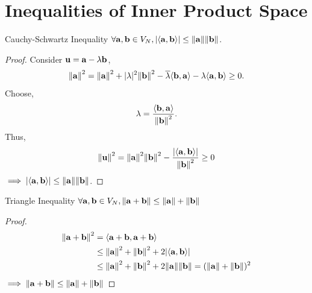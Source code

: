 \documentclass{book}
\def\innerproduct#1#2{\langle#1,#2\rangle}
\begin{document}
\section{Inequalities of Inner Product Space}
\begin{Theorems}{Cauchy-Schwartz Inequality}{}
	$\forall \vb{a},\vb{b} \in V_N, \abs{\innerproduct{\vb{a}}{\vb{b}}} \leq \norm{\vb{a}}\norm{\vb{b}}$.
\end{Theorems}
\begin{proof}
	Consider $\vb{u} = \vb{a} - \lambda\vb{b}$,
	\begin{equation}
		\norm{\vb{a}}^2 = \norm{\vb{a}}^2 + |\lambda|^2\norm{\vb{b}}^2 - \overline{\lambda}\innerproduct{\vb{b}}{\vb{a}} - \lambda\innerproduct{\vb{a}}{\vb{b}} \geq 0.
	\end{equation}
Choose, 
\begin{equation}
	\lambda = \frac{\innerproduct{\vb{b}}{\vb{a}}}{\norm{\vb{b}}^2}.
\end{equation}
Thus,
\begin{equation}
	\begin{split}
		\norm{\vb{u}}^2 = \norm{\vb{a}}^2 \norm{\vb{b}}^2 - \frac{\abs{\innerproduct{\vb{a}}{\vb{b}}}}{\norm{\vb{b}}^2} \geq 0
	\end{split}
\end{equation}
$\implies \abs{\innerproduct{\vb{a}}{\vb{b}}} \leq \norm{\vb{a}}\norm{\vb{b}}$.
\end{proof}
\begin{Theorems}{Triangle Inequality}{}
	$\forall \vb{a},\vb{b} \in V_N, \norm{\vb{a} + \vb{b}}  \leq \norm{\vb{a}} + \norm{\vb{b}}$
\end{Theorems}
\begin{proof}
	\begin{equation}
		\begin{split}
		\norm{\vb{a} + \vb{b}}^2 & = \innerproduct{\vb{a} + \vb{b}}{\vb{a} + \vb{b}} \\
		& \leq \norm{\vb{a}}^2 + \norm{\vb{b}}^2 + 2\abs{\innerproduct{\vb{a}}{\vb{b}}} \\
		& \leq \norm{\vb{a}}^2 + \norm{\vb{b}}^2 + 2\norm{\vb{a}}\norm{\vb{b}} = (\norm{\vb{a}} + \norm{\vb{b}})^2
		\end{split}
	\end{equation}
	$\implies \norm{\vb{a} + \vb{b}} \leq \norm{\vb{a}} + \norm{\vb{b}}$
\end{proof}
\end{document}

